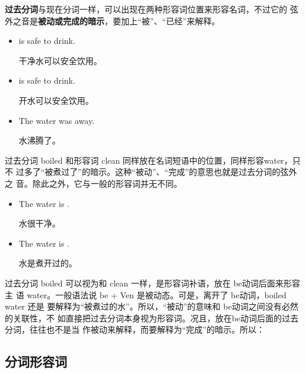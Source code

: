 \textbf{过去分词}与现在分词一样，可以出现在两种形容词位置来形容名词，不过它的
弦外之音是\textbf{被动或完成的暗示}，要加上“被”、“已经”来解释。

\begin{itemize}
\item {} is safe to drink.

干净水可以安全饮用。

\item {} is safe to drink.

开水可以安全饮用。

\item The water was  away.

  水沸腾了。
\end{itemize}

过去分词 boiled 和形容词 clean 同样放在名词短语中的位置，同样形容water，只不
过多了“被煮过了”的暗示。这种“被动”、“完成”的意思也就是过去分词的弦外之
音。除此之外，它与一般的形容词并无不同。

\begin{itemize}
\item The water is .

水很干净。
\item The water is .

水是煮开过的。
\end{itemize}

过去分词 boiled 可以视为和 clean 一样，是形容词补语，放在 be动词后面来形容主
语 water。一般语法说 be + Ven 是被动态。可是，离开了 be动词，boiled water 还是
要解释为“被煮过的水”。所以，“被动”的意味和 be动词之间没有必然的关联性，不
如直接把过去分词本身视为形容词。况且，放在be动词后面的过去分词，往往也不是当
作被动来解释，而要解释为“完成”的暗示。所以：

\subsection{分词形容词}

